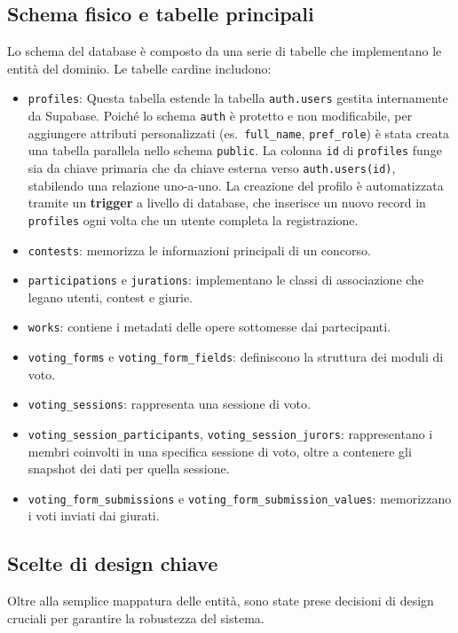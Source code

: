 \subsection{Schema fisico e tabelle principali}\label{subsec:schema-fisico-e-tabelle-principali}
Lo schema del database è composto da una serie di tabelle che implementano le entità del dominio.
Le tabelle cardine includono:
\begin{itemize}
	\item \texttt{profiles}: Questa tabella estende la tabella \texttt{auth.users} gestita internamente da Supabase.
	Poiché lo schema \texttt{auth} è protetto e non modificabile, per aggiungere attributi personalizzati (es.\ \texttt{full\_name}, \texttt{pref\_role}) è stata creata una tabella parallela nello schema \texttt{public}.
	La colonna \texttt{id} di \texttt{profiles} funge sia da chiave primaria che da chiave esterna verso \texttt{auth.users(id)}, stabilendo una relazione uno-a-uno.
	La creazione del profilo è automatizzata tramite un \textbf{trigger} a livello di database, che inserisce un nuovo record in \texttt{profiles} ogni volta che un utente completa la registrazione.
	\item \texttt{contests}: memorizza le informazioni principali di un concorso.
	\item \texttt{participations} e \texttt{jurations}: implementano le classi di associazione che legano utenti, contest e giurie.
	\item \texttt{works}: contiene i metadati delle opere sottomesse dai partecipanti.
	\item \texttt{voting\_forms} e \texttt{voting\_form\_fields}: definiscono la struttura dei moduli di voto.
	\item \texttt{voting\_sessions}: rappresenta una sessione di voto.
	\item \texttt{voting\_session\_participants}, \texttt{voting\_session\_jurors}: rappresentano i membri coinvolti in una specifica sessione di voto, oltre a contenere gli snapshot dei dati per quella sessione.
	\item \texttt{voting\_form\_submissions} e \texttt{voting\_form\_submission\_values}: memorizzano i voti inviati dai giurati.
\end{itemize}

\subsection{Scelte di design chiave}\label{subsec:scelte-di-design-chiave}
Oltre alla semplice mappatura delle entità, sono state prese decisioni di design cruciali per garantire la robustezza del sistema.

